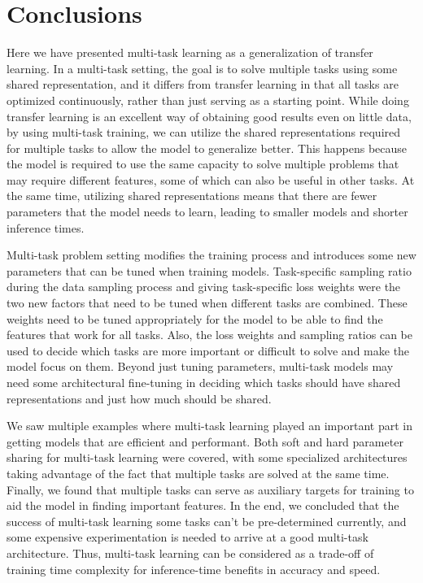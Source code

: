 \chapter{Conclusions}
Here we have presented multi-task learning as a generalization of transfer learning.
In a multi-task setting, the goal is to solve multiple tasks using some shared representation, and it differs from transfer learning in that all tasks are optimized continuously, rather than just serving as a starting point.
While doing transfer learning is an excellent way of obtaining good results even on little data, by using multi-task training, we can utilize the shared representations required for multiple tasks to allow the model to generalize better.
This happens because the model is required to use the same capacity to solve multiple problems that may require different features, some of which can also be useful in other tasks.
At the same time, utilizing shared representations means that there are fewer parameters that the model needs to learn, leading to smaller models and shorter inference times.

Multi-task problem setting modifies the training process and introduces some new parameters that can be tuned when training models.
Task-specific sampling ratio during the data sampling process and giving task-specific loss weights were the two new factors that need to be tuned when different tasks are combined.
These weights need to be tuned appropriately for the model to be able to find the features that work for all tasks.
Also, the loss weights and sampling ratios can be used to decide which tasks are more important or difficult to solve and make the model focus on them.
Beyond just tuning parameters, multi-task models may need some architectural fine-tuning in deciding which tasks should have shared representations and just how much should be shared.

We saw multiple examples where multi-task learning played an important part in getting models that are efficient and performant.
Both soft and hard parameter sharing for multi-task learning were covered, with some specialized architectures taking advantage of the fact that multiple tasks are solved at the same time.
Finally, we found that multiple tasks can serve as auxiliary targets for training to aid the model in finding important features.
In the end, we concluded that the success of multi-task learning some tasks can't be pre-determined currently, and some expensive experimentation is needed to arrive at a good multi-task architecture.
Thus, multi-task learning can be considered as a trade-off of training time complexity for inference-time benefits in accuracy and speed.